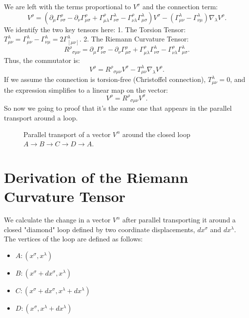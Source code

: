 \documentclass[11pt, a4paper]{report}
\begin{document}
We are left with the terms proportional to \(V^\sigma\) and the connection term:
\begin{equation}
[\nabla_\mu, \nabla_\nu] V^\rho = \left( \partial_\mu \Gamma^\rho_{\nu\sigma} - \partial_\nu \Gamma^\rho_{\mu\sigma} + \Gamma^\rho_{\mu\lambda} \Gamma^\lambda_{\nu\sigma} - \Gamma^\rho_{\nu\lambda} \Gamma^\lambda_{\mu\sigma} \right) V^\sigma - (\Gamma^\lambda_{\mu\nu} - \Gamma^\lambda_{\nu\mu}) \nabla_\lambda V^\rho.
\end{equation}
We identify the two key tensors here:
1. The Torsion Tensor: \(T^\lambda_{\mu\nu} = \Gamma^\lambda_{\mu\nu} - \Gamma^\lambda_{\nu\mu} = 2\Gamma^\lambda_{[\mu\nu]}\).
2. The Riemann Curvature Tensor:
\begin{equation}
\label{eq:riemann_def}
{R^\rho}_{\sigma\mu\nu} = \partial_\mu \Gamma^\rho_{\nu\sigma} - \partial_\nu \Gamma^\rho_{\mu\sigma} + \Gamma^\rho_{\mu\lambda} \Gamma^\lambda_{\nu\sigma} - \Gamma^\rho_{\nu\lambda} \Gamma^\lambda_{\mu\sigma}.
\end{equation}
Thus, the commutator is:
\begin{equation}
[\nabla_\mu, \nabla_\nu] V^\rho = {R^\rho}_{\sigma\mu\nu} V^\sigma - T^\lambda_{\mu\nu} \nabla_\lambda V^\rho.
\end{equation}
If we assume the connection is torsion-free (Christoffel connection), \(T^\lambda_{\mu\nu} = 0\), and the expression simplifies to a linear map on the vector:
\begin{equation}
[\nabla_\mu, \nabla_\nu] V^\rho = {R^\rho}_{\sigma\mu\nu} V^\sigma.
\end{equation}
So now we going to proof that it's the same one that appears in the parallel transport around a loop.
\begin{figure}[htbp]
    \centering
    
    \caption{Parallel transport of a vector $V^{\alpha}$ around the closed loop $A \rightarrow B \rightarrow C \rightarrow D \rightarrow A$.}
    \label{fig:diamond}
\end{figure}

\section*{Derivation of the Riemann Curvature Tensor}

We calculate the change in a vector $V^{\alpha}$ after parallel transporting it around a closed "diamond" loop defined by two coordinate displacements, $dx^{\sigma}$ and $dx^{\lambda}$. The vertices of the loop are defined as follows:
\begin{itemize}
    \item $A: (x^{\sigma}, x^{\lambda})$
    \item $B: (x^{\sigma} + dx^{\sigma}, x^{\lambda})$
    \item $C: (x^{\sigma} + dx^{\sigma}, x^{\lambda} + dx^{\lambda})$
    \item $D: (x^{\sigma}, x^{\lambda} + dx^{\lambda})$
\end{itemize}
\end{document}
